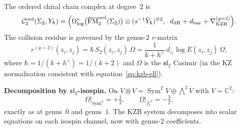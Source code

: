 \documentclass[11pt,reqno]{amsart}
\theoremstyle{definition}
\theoremstyle{remark}
\newcommand{\cC}{\mathcal{C}}
\DeclareMathOperator{\FM}{FM}
\newcommand{\CC}{\mathbb{C}}
\numberwithin{equation}{section}
\begin{document}
The ordered chiral chain complex at degree~$2$ is
\begin{equation}\label{eq:g2-degree2-cx}
  \cC_2^{\mathrm{ord}}(\Sigma_2, Y_\hbar)
  = \Bigl(
  \Omega^*_{\log}\bigl(
  \overline{\FM}_2^{\mathrm{ord}}(\Sigma_2)\bigr)
  \otimes (s^{-1}\bar{Y}_\hbar)^{\otimes 2},
  \;\;
  d_{\mathrm{dR}} + d_{\mathrm{bar}}
  + \nabla_{\mathrm{KZB}}^{(g=2)}
  \Bigr).
\end{equation}
The collision residue is governed by the genus-$2$
$r$-matrix
\begin{equation}\label{eq:r-g2}
  r^{(g=2)}(z_i, z_j)
  = \hbar\,S_2(z_i, z_j)\,\Omega
  = \frac{1}{k + h^\vee}\,
  d_{z_i}\!\log E(z_i, z_j)\,\Omega,
\end{equation}
where $\hbar = 1/(k + h^\vee) = 1/(k+2)$ and $\Omega$
is the $\mathfrak{sl}_2$ Casimir (in the KZ normalisation
consistent with equation~\eqref{eq:kzb-ell}).

\smallskip
\noindent
\textbf{Decomposition by $\mathfrak{sl}_2$-isospin.}
On $V \otimes V = \operatorname{Sym}^2 V \oplus
\bigwedge\nolimits^2 V$ with $V = \CC^2$:
\[
  \Omega\big|_{\operatorname{Sym}^2} = +\tfrac{1}{2},
  \qquad
  \Omega\big|_{\bigwedge^2} = -\tfrac{3}{2},
\]
exactly as at genus~$0$ and genus~$1$. The KZB system
decomposes into scalar equations on each isospin channel,
now with genus-$2$ coefficients.
\end{document}
